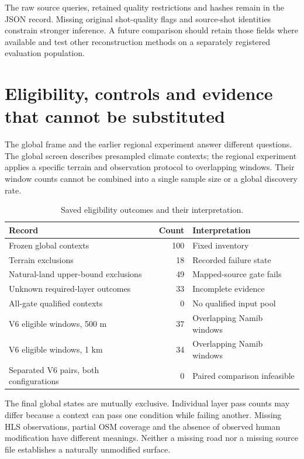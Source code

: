 \documentclass{article}
\begin{document}
The raw source queries, retained quality restrictions and hashes remain in the JSON record. Missing original shot-quality flags and source-shot identities constrain stronger inference. A future comparison should retain those fields where available and test other reconstruction methods on a separately registered evaluation population.

\clearpage
\section{Eligibility, controls and evidence that cannot be substituted}
\label{app:gates}
The global frame and the earlier regional experiment answer different questions. The global screen describes presampled climate contexts; the regional experiment applies a specific terrain and observation protocol to overlapping windows. Their window counts cannot be combined into a single sample size or a global discovery rate.

\begin{table}[h]
\centering
\caption{Saved eligibility outcomes and their interpretation.}
\begin{tabular}{p{.48\linewidth}rp{.30\linewidth}}
\toprule
Record & Count & Interpretation\\
\midrule
Frozen global contexts & 100 & Fixed inventory\\
Terrain exclusions & 18 & Recorded failure state\\
Natural-land upper-bound exclusions & 49 & Mapped-source gate fails\\
Unknown required-layer outcomes & 33 & Incomplete evidence\\
All-gate qualified contexts & 0 & No qualified input pool\\
V6 eligible windows, 500 m & 37 & Overlapping Namib windows\\
V6 eligible windows, 1 km & 34 & Overlapping Namib windows\\
Separated V6 pairs, both configurations & 0 & Paired comparison infeasible\\
\bottomrule
\end{tabular}
\end{table}

The final global states are mutually exclusive. Individual layer pass counts may differ because a context can pass one condition while failing another. Missing HLS observations, partial OSM coverage and the absence of observed human modification have different meanings. Neither a missing road nor a missing source file establishes a naturally unmodified surface.
\end{document}
